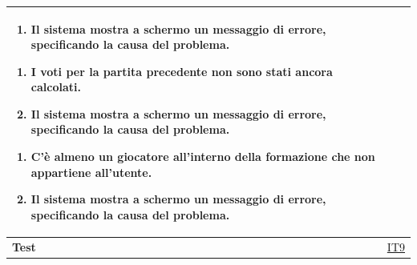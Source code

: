 \begin{table}[H]
\begin{tabularx}{\textwidth}{|l|X|}
\begin{enumerate}[leftmargin=*,label=3.\arabic*]
    \item Il sistema mostra a schermo un messaggio di errore, specificando la causa del problema.
\end{enumerate} 
\begin{enumerate}[leftmargin=*,label=4.\arabic*]
    \item I voti per la partita precedente non sono stati ancora calcolati.
    \item Il sistema mostra a schermo un messaggio di errore, specificando la causa del problema.
\end{enumerate}
\begin{enumerate}[leftmargin=*,label=5.\arabic*]
    \item C'è almeno un giocatore all'interno della formazione che non appartiene all'utente.
    \item Il sistema mostra a schermo un messaggio di errore, specificando la causa del problema.
\end{enumerate} \\
\hline
\textbf{Test} & \hyperref[IT9]{IT9} \\
\hline
\end{tabularx}

\end{table}



